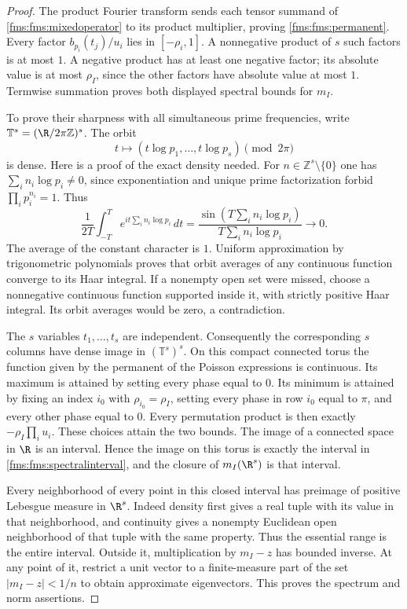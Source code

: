 \documentclass[11pt,a4paper]{article}
\theoremstyle{definition}\newtheorem{definition}[theorem]{Definition}
\newcommand{\Z}{\mathbb Z}\newcommand{\Q}{\mathbb Q}
\begin{document}
\begin{proof}
The product Fourier transform sends each tensor summand of
\eqref{fms:fms:mixedoperator} to its product multiplier, proving
\eqref{fms:fms:permanent}.  Every factor
$b_{p_i}(t_j)/u_i$ lies in $[-\rho_i,1]$. A nonnegative product
of $s$ such factors is at most $1$.  A negative product has at
least one negative factor; its absolute value is at most
$\rho_I$, since the other factors have absolute value at most $1$.
Termwise summation proves both displayed spectral bounds for $m_I$.

To prove their sharpness with all simultaneous prime frequencies,
write $\mathbb T^s=(\R/2\pi\Z)^s$. The orbit
\[
 t\longmapsto(t\log p_1,\ldots,t\log p_s)\pmod{2\pi}
\]
is dense.  Here is a proof of the exact density needed.
For $n\in\Z^s\setminus\{0\}$ one has
$\sum_i n_i\log p_i\ne0$, since exponentiation and unique prime
factorization forbid $\prod_i p_i^{n_i}=1$. Thus
\[
 \frac1{2T}\int_{-T}^T e^{it\sum_i n_i\log p_i}\,dt
 =\frac{\sin(T\sum_i n_i\log p_i)}
          {T\sum_i n_i\log p_i}\longrightarrow0.
\]
The average of the constant character is $1$. Uniform approximation
by trigonometric polynomials proves that orbit averages of any
continuous function converge to its Haar integral. If a nonempty
open set were missed, choose a nonnegative continuous function
supported inside it, with strictly positive Haar integral.
Its orbit averages would be zero, a contradiction.

The $s$ variables $t_1,\ldots,t_s$ are independent.  Consequently
the corresponding $s$ columns have dense image in
$(\mathbb T^s)^s$.  On this compact connected torus the function
given by the permanent of the Poisson expressions is continuous.
Its maximum is attained by setting every phase equal to $0$.
Its minimum is attained by fixing an index $i_0$ with
$\rho_{i_0}=\rho_I$, setting every phase in row $i_0$ equal to
$\pi$, and every other phase equal to $0$.
Every permutation product is then exactly
$-\rho_I\prod_i u_i$.  These choices attain the two bounds.
The image of a connected space in $\R$ is an interval. Hence the
image on this torus is exactly the interval in
\eqref{fms:fms:spectralinterval}, and the closure of $m_I(\R^s)$ is
that interval.

Every neighborhood of every point in this closed interval has
preimage of positive Lebesgue measure in $\R^s$. Indeed density
first gives a real tuple with its value in that neighborhood,
and continuity gives a nonempty Euclidean open neighborhood of
that tuple with the same property.  Thus the essential range is
the entire interval. Outside it, multiplication by $m_I-z$ has
bounded inverse. At any point of it, restrict a unit vector to a
finite-measure part of the set $|m_I-z|<1/n$ to obtain approximate
eigenvectors. This proves the spectrum and norm assertions.


\end{proof}
\end{document}
